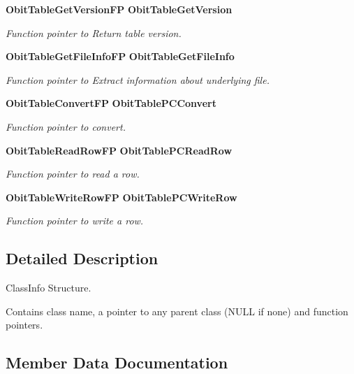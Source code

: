 \begin{CompactItemize}
{\bf Obit\-Table\-Get\-Version\-FP} {\bf Obit\-Table\-Get\-Version}
\begin{CompactList}\small\item\em Function pointer to Return table version. \item\end{CompactList}\item 
{\bf Obit\-Table\-Get\-File\-Info\-FP} {\bf Obit\-Table\-Get\-File\-Info}
\begin{CompactList}\small\item\em Function pointer to Extract information about underlying file. \item\end{CompactList}\item 
{\bf Obit\-Table\-Convert\-FP} {\bf Obit\-Table\-PCConvert}
\begin{CompactList}\small\item\em Function pointer to convert. \item\end{CompactList}\item 
{\bf Obit\-Table\-Read\-Row\-FP} {\bf Obit\-Table\-PCRead\-Row}
\begin{CompactList}\small\item\em Function pointer to read a row. \item\end{CompactList}\item 
{\bf Obit\-Table\-Write\-Row\-FP} {\bf Obit\-Table\-PCWrite\-Row}
\begin{CompactList}\small\item\em Function pointer to write a row. \item\end{CompactList}\end{CompactItemize}


\subsection{Detailed Description}
Class\-Info Structure. 

Contains class name, a pointer to any parent class (NULL if none) and function pointers. 



\subsection{Member Data Documentation}
